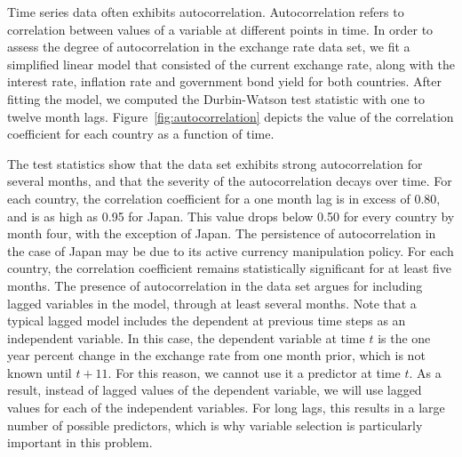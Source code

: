 \documentclass{sig-alternate-05-2015}
\begin{document}
Time series data often exhibits autocorrelation. Autocorrelation refers to correlation between values of a variable at different points in time. In order to assess the degree of autocorrelation in the exchange rate data set, we fit a simplified linear model that consisted of the current exchange rate, along with the interest rate, inflation rate and government bond yield for both countries. After fitting the model, we computed the Durbin-Watson test statistic with one to twelve month lags. Figure~\ref{fig:autocorrelation} depicts the value of the correlation coefficient for each country as a function of time.
\par{} The test statistics show that the data set exhibits strong autocorrelation for several months, and that the severity of the autocorrelation decays over time. For each country, the correlation coefficient for a one month lag is in excess of 0.80, and is as high as 0.95 for Japan. This value drops below 0.50 for every country by month four, with the exception of Japan. The persistence of autocorrelation in the case of Japan may be due to its active currency manipulation policy. For each country, the correlation coefficient remains statistically significant for at least five months. The presence of autocorrelation in the data set argues for including lagged variables in the model, through at least several months. Note that a typical lagged model includes the dependent at previous time steps as an independent variable. In this case, the dependent variable at time $t$ is the one year percent change in the exchange rate from one month prior, which is not known until $t+11$. For this reason, we cannot use it a predictor at time $t$. As a result, instead of lagged values of the dependent variable, we will use lagged values for each of the independent variables. For long lags, this results in a large number of possible predictors, which is why variable selection is particularly important in this problem.

\end{document}
